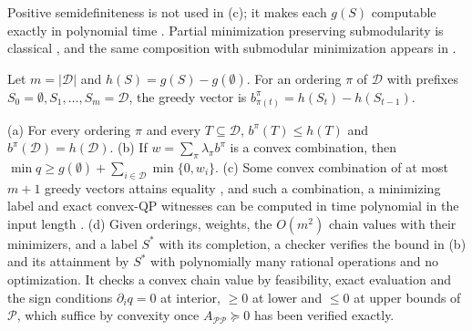 Positive semidefiniteness is not used in (c); it makes each $g(S)$
computable exactly in polynomial time \cite{KozlovTarasovKhachiyan1980}.
Partial minimization preserving submodularity is classical
\cite{Topkis1978}, and the same composition with submodular minimization
appears in \cite{BuntonTabuada2022,GomezHan2025}.

Let $m=|\mathcal D|$ and $h(S)=g(S)-g(\emptyset)$. For an ordering $\pi$ of
$\mathcal D$ with prefixes $S_0=\emptyset,S_1,\ldots,S_m=\mathcal D$, the
greedy vector is $b^\pi_{\pi(t)}=h(S_t)-h(S_{t-1})$.

\begin{proposition}\label{prop:cr-greedy}
(a) For every ordering $\pi$ and every $T\subseteq\mathcal D$,
$b^\pi(T)\le h(T)$ and $b^\pi(\mathcal D)=h(\mathcal D)$.
(b) If $w=\sum_\pi\lambda_\pi b^\pi$ is a convex combination, then
$\min q\ge g(\emptyset)+\sum_{i\in\mathcal D}\min\{0,w_i\}$.
(c) Some convex combination of at most $m+1$ greedy vectors attains
equality \cite{Edmonds1970}, and such a combination, a minimizing label
and exact convex-QP witnesses can be computed in time polynomial in the
input length \cite{GrotschelLovaszSchrijver1988}.
(d) Given orderings, weights, the $O(m^2)$ chain values with their
minimizers, and a label $S^*$ with its completion, a checker verifies the
bound in (b) and its attainment by $S^*$ with polynomially many rational
operations and no optimization. It checks a convex chain value by
feasibility, exact evaluation and the sign conditions
$\partial_iq=0$ at interior, $\ge0$ at lower and $\le0$ at upper bounds
of $\mathcal P$, which suffice by convexity once
$A_{\mathcal P\mathcal P}\succeq0$ has been verified exactly.
\end{proposition}
